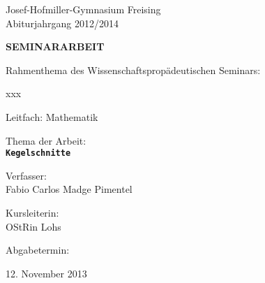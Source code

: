 \begin{titlepage}
\begin{center}


\begin{minipage}{1\textwidth}
Josef-Hofmiller-Gymnasium Freising\\
Abiturjahrgang 2012/2014
\end{minipage}

\vspace{1cm}

\textbf{\uppercase{\Large Seminararbeit}}

\vspace{1cm}

Rahmenthema des Wissenschaftspropädeutischen Seminars:

xxx

Leitfach: Mathematik

\vspace{1cm}

{\large Thema der Arbeit:\\}
\vspace{.1cm}
\texttt{\textbf{\LARGE Kegelschnitte}}

\vfill

\begin{minipage}{0.4\textwidth}
\begin{flushleft}
Verfasser:\\
Fabio Carlos Madge Pimentel
\end{flushleft}
\end{minipage}
\begin{minipage}{0.4\textwidth}
\begin{flushright}
Kursleiterin:\\
OStRin Lohs
\end{flushright}
\end{minipage}

\vspace{0.6cm}

\begin{minipage}{0.4\textwidth}
\begin{flushleft}
Abgabetermin:
\end{flushleft}
\end{minipage}
\begin{minipage}{0.4\textwidth}
\begin{flushright}
12. November 2013
\end{flushright}
\end{minipage}

\vspace{1cm}


\end{center}
\end{titlepage}
